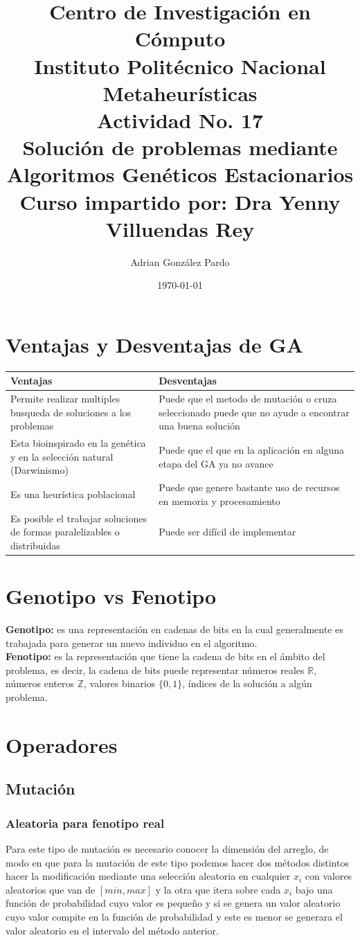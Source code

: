 \documentclass[10pt]{article}
\title{Centro de Investigación en Cómputo\\Instituto Politécnico Nacional\\Metaheurísticas\\Actividad No. 17\\Solución de problemas mediante Algoritmos Genéticos Estacionarios\\Curso impartido por: Dra Yenny Villuendas Rey}
\author{Adrian González Pardo}
\date{\today}
\begin{document}
\maketitle
\section{Ventajas y Desventajas de GA}
\begin{center}
  \begin{tabular}{|p{6cm}|p{6cm}|}
    \hline
    Ventajas & Desventajas \\
    \hline
    Permite realizar multiples busqueda de soluciones a los problemas & Puede que el metodo de mutación o cruza seleccionado puede que no ayude a encontrar una buena solución\\
    \hline
    Esta bioinspirado en la genética y en la selección natural (Darwinismo) & Puede que el que en la aplicación en alguna etapa del GA ya no avance \\
    \hline
    Es una heurística poblacional & Puede que genere bastante uso de recursos en memoria y procesamiento \\
    \hline
    Es posible el trabajar soluciones de formas paralelizables o distribuidas&Puede ser difícil de implementar\\
    \hline
  \end{tabular}
\end{center}
\section{Genotipo vs Fenotipo}
\textbf{Genotipo:} es una representación en cadenas de bits en la cual generalmente es trabajada para generar un nuevo individuo en el algoritmo.
\\
\textbf{Fenotipo:} es la representación que tiene la cadena de bits en el ámbito del problema, es decir, la cadena de bits puede representar números reales $\mathbb{R}$, números enteros $\mathbb{Z}$, valores binarios $\{0,1\}$, índices de la solución a algún problema.

\section{Operadores}
\subsection{Mutación}
\subsubsection{Aleatoria para fenotipo real}
Para este tipo de mutación es necesario conocer la dimensión del arreglo, de modo en que para la mutación de este tipo podemos hacer dos métodos distintos hacer la modificación mediante una selección aleatoria en cualquier $x_{i}$ con valores aleatorios que van de $[min,max]$ y la otra que itera sobre cada $x_{i}$ bajo una función de probabilidad cuyo valor es pequeño y si se genera un valor aleatorio cuyo valor compite en la función de probabilidad y este es menor se generara el valor aleatorio en el intervalo del método anterior.
\end{document}
